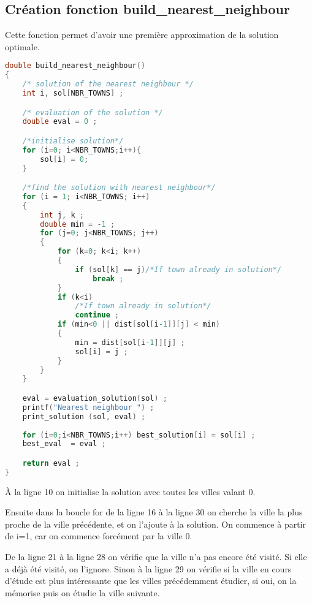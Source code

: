 \documentclass[11pt]{article}
\begin{document}
\subsection{Création fonction build\_nearest\_neighbour}

Cette fonction permet d'avoir une première approximation de la solution optimale.

\begin{lstlisting}[language=C]
double build_nearest_neighbour()
{
    /* solution of the nearest neighbour */
    int i, sol[NBR_TOWNS] ;

    /* evaluation of the solution */
    double eval = 0 ;

    /*initialise solution*/
    for (i=0; i<NBR_TOWNS;i++){
        sol[i] = 0;
    }

    /*find the solution with nearest neighbour*/
    for (i = 1; i<NBR_TOWNS; i++)
    {
        int j, k ;
        double min = -1 ;
        for (j=0; j<NBR_TOWNS; j++)
        {
            for (k=0; k<i; k++)
            {
                if (sol[k] == j)/*If town already in solution*/
                    break ;
            }
            if (k<i)
                /*If town already in solution*/
                continue ;
            if (min<0 || dist[sol[i-1]][j] < min)
            {
                min = dist[sol[i-1]][j] ;
                sol[i] = j ;
            }
        }
    }

    eval = evaluation_solution(sol) ;
    printf("Nearest neighbour ") ;
    print_solution (sol, eval) ;
    
    for (i=0;i<NBR_TOWNS;i++) best_solution[i] = sol[i] ;
    best_eval  = eval ;

    return eval ;
}

\end{lstlisting}

À la ligne 10 on initialise la solution avec toutes les villes valant 0.

Ensuite dans la boucle for de la ligne 16 à la ligne 30 on cherche la ville la plus proche de la ville précédente, et on l'ajoute à la solution. On commence à partir de i=1, car on commence forcément par la ville 0.

De la ligne 21 à la ligne 28 on vérifie que la ville n'a pas encore été visité. Si elle a déjà été visité, on l'ignore. Sinon à la ligne 29 on vérifie si la ville en cours d'étude est plus intéressante que les villes précédemment étudier, si oui, on la mémorise puis on étudie la ville suivante.
\end{document}

